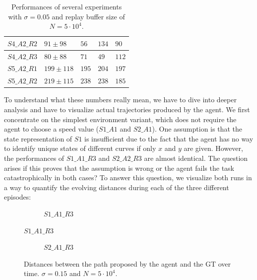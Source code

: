\begin{table}[H]
\begin{tabular}{|l|l|l|l|l|}
{\color[HTML]{333333} $S4\_A2\_R2$}       & {\color[HTML]{333333} $91 \pm 98$}                & {\color[HTML]{333333} $56$}            & {\color[HTML]{333333} $134$}           & {\color[HTML]{333333} $90$}            \\ \hline
$S4\_A2\_R3$                              & $80 \pm 88$                                     & $71$                                  & $49$                                  & $112$                                  \\ \hline
$S5\_A2\_R1$                              & $199 \pm 118$                                     & $195$                                  & $204$                                  & $197$                                  \\ \hline
$S5\_A2\_R2$                              & $219 \pm 115$                                     & $238$                                  & $238$                                  & $185$                                  \\ \hline
\end{tabular}
\caption{ Performances of several experiments with $\sigma = 0.05$ and replay buffer size of $N=5 \cdot 10^4$.}
\label{tab:resultsK3}
\end{table}

To understand what these numbers really mean, we have to dive into deeper analysis and have to visualize actual trajectories produced by the agent. We first concentrate on the simplest environment variant, which does not require the agent to choose a speed value ($S1\_A1$ and $S2\_A1$). One assumption is that the state representation of $S1$ is insufficient due to the fact that the agent has no way to identify unique states of different curves if only $x$ and $y$ are given. However, the performances of $S1\_A1\_R3$ and $S2\_A2\_R3$ are almost identical. The question arises if this proves that the assumption is wrong or the agent fails the task catastrophically in both cases? To answer this question, we visualize both runs in a way to quantify the evolving distances during each of the three different episodes:
\par

\begin{figure}[H]
     \centering
     \begin{subfigure}[b]{0.9\textwidth}
         \centering
         
         \caption{$S1\_A1\_R3$}
     \end{subfigure}
\end{figure}
\begin{figure}[H]\ContinuedFloat
     \begin{subfigure}[b]{0.9\textwidth}
         \centering
         
         \caption{$S2\_A1\_R3$}
     \end{subfigure}
        \caption{Distances between the path proposed by the agent and the GT over time. $\sigma = 0.15$ and $N=5\cdot 10^4$.}
        \label{fig:simpleCurves1}
\end{figure}

